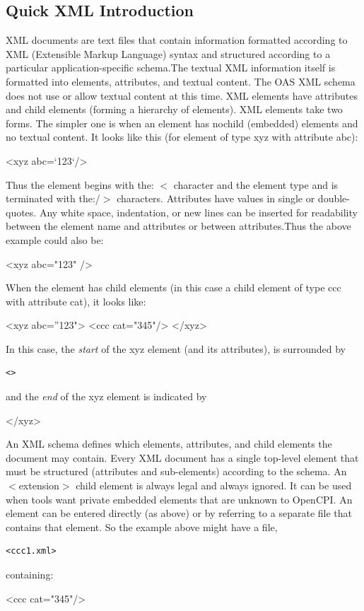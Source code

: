 \documentclass[10pt, a4paper, oneside]{article}
\renewcommand\_{\textunderscore\allowbreak} %
\begin{document}
\subsection{Quick XML Introduction}
XML documents are text files that contain information formatted according to XML (Extensible Markup Language) syntax and structured according to a particular application-specific schema.The textual XML information itself is formatted into elements, attributes, and  textual content.  The OAS XML schema does not use or allow textual content at this time.  XML elements have attributes and child elements (forming a hierarchy of elements).  XML elements take two forms. The simpler one is when an element has nochild (embedded) elements and no textual content.  It looks like this (for element of type xyz with attribute abc): \begin{ocpixml}
<xyz abc=`123`/>
\end{ocpixml}
Thus the element begins with the: $<$ character and the element type and is terminated with the:/\/$>$ characters. Attributes have values in single or double-quotes.  Any white space, indentation, or new lines can be inserted for readability between the element name and attributes or between attributes.Thus the above example could also be: \begin{ocpixml}
<xyz
abc="123" 
/>\end{ocpixml}
When the element has child elements (in this case a child element of type ccc with attribute cat), 
it looks like:\begin{ocpixml}
<xyz abc=''123">
<ccc cat="345"/>
</xyz>\end{ocpixml}

In this case, the \emph{start} of the xyz element (and its attributes), is surrounded by \begin{verbatim}<>\end{verbatim} and the \emph{end} of the xyz element is indicated by \begin{ocpixml}
</xyz>
\end{ocpixml} 
An XML schema defines which elements, attributes, and child elements the document may contain. Every XML document has a single top-level element that must be structured (attributes and sub-elements) according to the schema.  An $<$extension$>$ child element is always legal and always ignored.  It can be used when tools want private embedded elements that are unknown to OpenCPI. An element can be entered directly (as above) or by referring to a separate file that contains that element. So the example above might have a file, \begin{verbatim}<ccc1.xml>\end{verbatim} containing: \begin{ocpixml}
<ccc cat="345"/>
\end{ocpixml}
\end{document}
